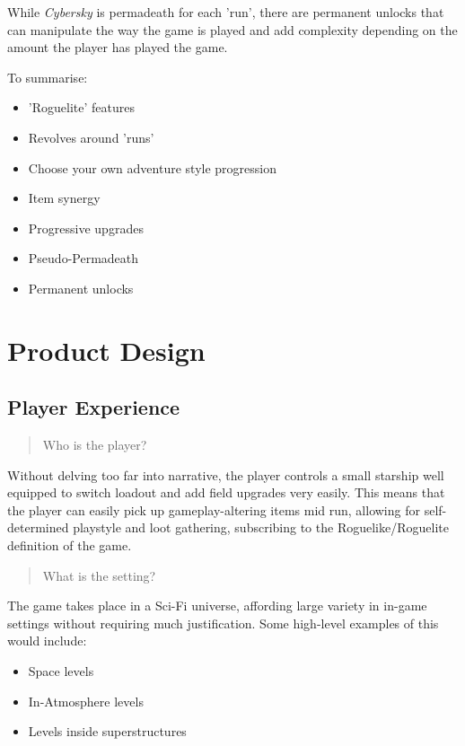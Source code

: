 \documentclass{scrartcl}
\begin{document}
While \emph{Cybersky} is permadeath for each 'run', there are permanent unlocks that can manipulate the way the game is played and add complexity depending on the amount the player has played the game.

To summarise:

\begin{itemize}
  \item 'Roguelite' features
  \item Revolves around 'runs'
  \item Choose your own adventure style progression
  \item Item synergy
  \item Progressive upgrades
  \item Pseudo-Permadeath
  \item Permanent unlocks
\end{itemize}

\section{
  Product Design
 }

\subsection{Player Experience}

\begin{quote}
  Who is the player?
\end{quote}

Without delving too far into narrative, the player controls a small starship well equipped to switch loadout and add field upgrades very easily. This means that the player can easily pick up gameplay-altering items mid run, allowing for self-determined playstyle and loot gathering, subscribing to the Roguelike/Roguelite definition of the game.

\begin{quote}
  What is the setting?
\end{quote}

The game takes place in a Sci-Fi universe, affording large variety in in-game settings without requiring much justification. Some high-level examples of this would include:

\begin{itemize}
  \item Space levels
  \item In-Atmosphere levels
  \item Levels inside superstructures
\end{itemize}
\end{document}
